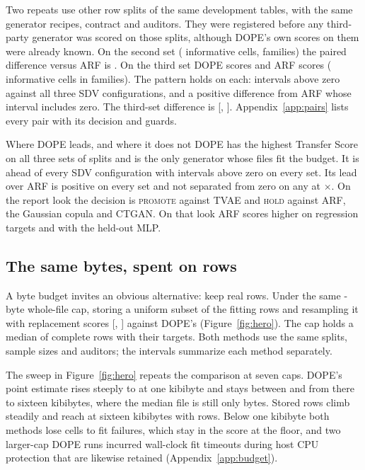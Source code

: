 \documentclass[10pt,letterpaper,twocolumn]{article}
\newcommand{\x}{\ensuremath{\times}}
\begin{document}
Two repeats use other row splits of the same development tables, with the same generator recipes, contract and auditors. They were registered before any third-party generator was scored on those splits, although DOPE's own scores on them were already known. On the second set ( informative cells,  families) the paired difference versus ARF is . On the third set DOPE scores  and ARF scores  ( informative cells in  families). The pattern holds on each: intervals above zero against all three SDV configurations, and a positive difference from ARF whose interval includes zero. The third-set difference is  [, ]. Appendix~\ref{app:pairs} lists every pair with its decision and guards.

\begin{callout}{Where DOPE leads, and where it does not}
DOPE has the highest Transfer Score on all three sets of splits and is the only generator whose files fit the budget. It is ahead of every SDV configuration with intervals above zero on every set. Its lead over ARF is positive on every set and not separated from zero on any at \x{}. On the report look the decision is \textsc{promote} against TVAE and \textsc{hold} against ARF, the Gaussian copula and CTGAN. On that look ARF scores higher on regression targets and with the held-out MLP.
\end{callout}

\subsection{The same bytes, spent on rows}
A byte budget invites an obvious alternative: keep real rows. Under the same -byte whole-file cap, storing a uniform subset of the fitting rows and resampling it with replacement scores  [, ] against DOPE's  (Figure~\ref{fig:hero}). The cap holds a median of  complete rows with their targets. Both methods use the same splits, sample sizes and auditors; the intervals summarize each method separately.

The sweep in Figure~\ref{fig:hero} repeats the comparison at seven caps. DOPE's point estimate rises steeply to  at one kibibyte and stays between  and  from there to sixteen kibibytes, where the median file is still only  bytes. Stored rows climb steadily and reach  at sixteen kibibytes with  rows. Below one kibibyte both methods lose cells to fit failures, which stay in the score at the floor, and two larger-cap DOPE runs incurred wall-clock fit timeouts during host CPU protection that are likewise retained (Appendix~\ref{app:budget}).
\end{document}
